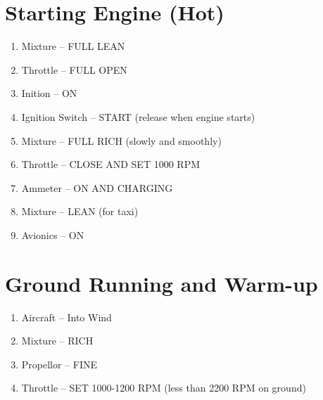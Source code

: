 \section{Starting Engine (Hot)}
\begin{enumerate}
  \item Mixture -- FULL LEAN
  \item Throttle -- FULL OPEN
  \item Inition -- ON
  \item Ignition Switch -- START (release when engine starts)
  \item Mixture -- FULL RICH (slowly and smoothly)
  \item Throttle -- CLOSE AND SET 1000 RPM
  \item Ammeter -- ON AND CHARGING
  \item Mixture -- LEAN (for taxi)
  \item Avionics -- ON 
\end{enumerate}

\section{Ground Running and Warm-up}
\begin{enumerate}[(1)]
  \item Aircraft -- Into Wind
  \item Mixture -- RICH
  \item Propellor -- FINE
  \item Throttle -- SET 1000-1200 RPM (less than 2200 RPM on ground)
\end{enumerate} 



